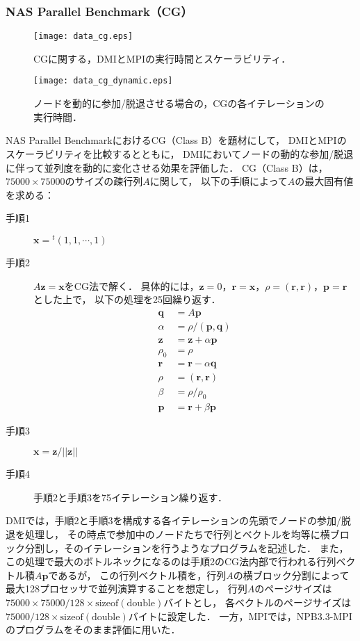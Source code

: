 \documentclass[10pt]{jsarticle}
\begin{document}
\subsubsection{NAS Parallel Benchmark（CG）}
\label{sec:perform_cg}

\begin{figure}
  \centering
  \texttt{[image: data\_cg.eps]}
  \caption{CGに関する，DMIとMPIの実行時間とスケーラビリティ．}
  \label{fig:data_cg}
\end{figure}

\begin{figure}
  \centering
  \texttt{[image: data\_cg\_dynamic.eps]}
  \caption{ノードを動的に参加/脱退させる場合の，CGの各イテレーションの実行時間．}
  \label{fig:data_cg_dynamic}
\end{figure}

NAS Parallel BenchmarkにおけるCG（Class B）を題材にして，
DMIとMPIのスケーラビリティを比較するとともに，
DMIにおいてノードの動的な参加/脱退に伴って並列度を動的に変化させる効果を評価した．
CG（Class B）は，$75000\times75000$のサイズの疎行列$A$に関して，
以下の手順によって$A$の最大固有値を求める：

\begin{description}
\item[手順1] $\bm x={}^t(1,1,\cdots,1)$
\item[手順2] $A\bm z=\bm x$をCG法で解く．
具体的には，$\bm z=0$，$\bm r=\bm x$，$\rho=(\bm r,\bm r)$，$\bm p=\bm r$とした上で，
以下の処理を25回繰り返す．
\begin{align*}
\bm q&=A\bm p\\
\alpha&=\rho/(\bm p,\bm q)\\
\bm z&=\bm z+\alpha\bm p\\
\rho_0&=\rho\\
\bm r&=\bm r-\alpha\bm q\\
\rho&=(\bm r,\bm r)\\
\beta&=\rho/\rho_0\\
\bm p&=\bm r+\beta\bm p
\end{align*}
\item[手順3] $\bm x=\bm z/||\bm z||$
\item[手順4] 手順2と手順3を75イテレーション繰り返す．
\end{description}

DMIでは，手順2と手順3を構成する各イテレーションの先頭でノードの参加/脱退を処理し，
その時点で参加中のノードたちで行列とベクトルを均等に横ブロック分割し，そのイテレーションを行うようなプログラムを記述した．
また，この処理で最大のボトルネックになるのは手順2のCG法内部で行われる行列ベクトル積$A\bm p$であるが，
この行列ベクトル積を，行列$A$の横ブロック分割によって最大128プロセッサで並列演算することを想定し，
行列$A$のページサイズは$75000\times75000/128\times \mathrm{sizeof(double)}$バイトとし，
各ベクトルのページサイズは$75000/128\times \mathrm{sizeof(double)}$バイトに設定した．
一方，MPIでは，NPB3.3-MPIのプログラムをそのまま評価に用いた．
\end{document}
